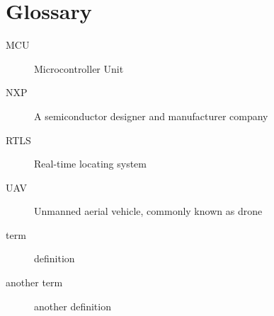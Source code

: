 \chapter{Glossary}

\begin{description}
\item [MCU] Microcontroller Unit
\item [NXP] A semiconductor designer and manufacturer company
\item [RTLS] Real-time locating system
\item [UAV] Unmanned aerial vehicle, commonly known as drone

\item [term] definition
\item [another term] another definition
\end{description}